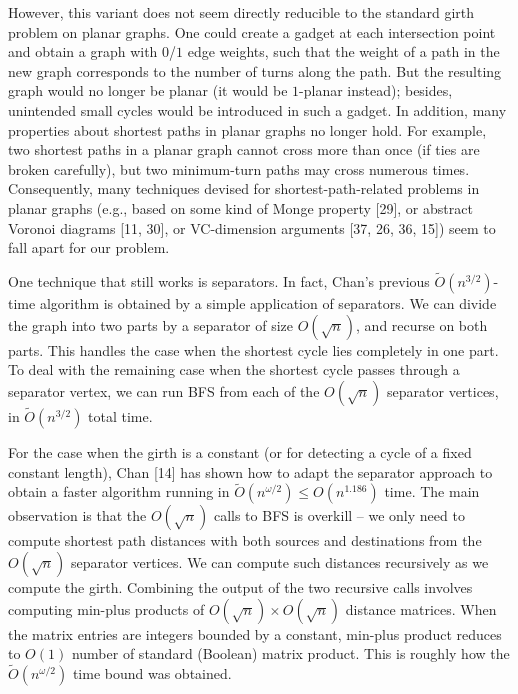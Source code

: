 \documentclass[10pt,a4paper]{article}
\begin{document}
\par
\par
However, this variant does not seem directly reducible to the standard girth problem on planar graphs. One could create a gadget at each intersection point and obtain a graph with $0$/$1$ edge weights, such that the weight of a path in the new graph corresponds to the number of turns along the path. But the resulting graph would no longer be planar (it would be $1$-planar instead); besides, unintended small cycles would be introduced in such a gadget. In addition, many properties about shortest paths in planar graphs no longer hold. For example, two shortest paths in a planar graph cannot cross more than once (if ties are broken carefully), but two minimum-turn paths may cross numerous times. Consequently, many techniques devised for shortest-path-related problems in planar graphs (e.g., based on some kind of Monge property [29], or abstract Voronoi diagrams [11, 30], or VC-dimension arguments [37, 26, 36, 15]) seem to fall apart for our problem.
\par
\par
One technique that still works is separators. In fact, Chan’s previous $\widetilde{O}(n^{3/2})$-time algorithm is obtained by a simple application of separators. We can divide the graph into two parts by a separator of size $O(\sqrt{n})$, and recurse on both parts. This handles the case when the shortest cycle lies completely in one part. To deal with the remaining case when the shortest cycle passes through a separator vertex, we can run BFS from each of the $O(\sqrt{n})$ separator vertices, in $\widetilde{O}(n^{3/2})$ total time.
\par
\par
For the case when the girth is a constant (or for detecting a cycle of a fixed constant length), Chan [14] has shown how to adapt the separator approach to obtain a faster algorithm running in $\widetilde{O}(n^{\omega/2})\leq O(n^{1.186})$ time. The main observation is that the $O(\sqrt{n})$ calls to BFS is overkill – we only need to compute shortest path distances with both sources and destinations from the $O(\sqrt{n})$ separator vertices. We can compute such distances recursively as we compute the girth. Combining the output of the two recursive calls involves computing min-plus products of $O(\sqrt{n})\times O(\sqrt{n})$ distance matrices. When the matrix entries are integers bounded by a constant, min-plus product reduces to $O(1)$ number of standard (Boolean) matrix product. This is roughly how the $\widetilde{O}(n^{\omega/2})$ time bound was obtained.
\end{document}
